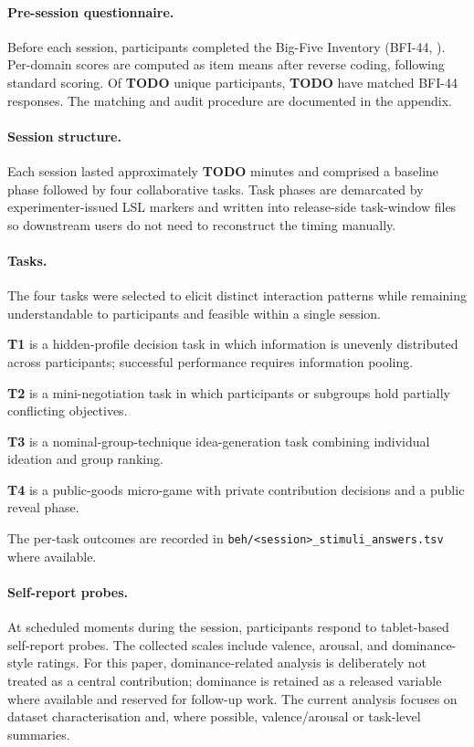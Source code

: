 \documentclass{article}
\begin{document}
\paragraph{Pre-session questionnaire.}
Before each session, participants completed the Big-Five Inventory
(BFI-44, \cite{john1999bigfive}).
Per-domain scores are computed as item means after reverse coding, following
standard scoring.
Of \textbf{TODO} unique participants, \textbf{TODO} have matched BFI-44
responses.
The matching and audit procedure are documented in the appendix.

\paragraph{Session structure.}
Each session lasted approximately \textbf{TODO} minutes and comprised a
baseline phase followed by four collaborative tasks.
Task phases are demarcated by experimenter-issued LSL markers and written
into release-side task-window files so downstream users do not need to
reconstruct the timing manually.

\paragraph{Tasks.}
The four tasks were selected to elicit distinct interaction patterns while
remaining understandable to participants and feasible within a single session.

\textbf{T1} is a hidden-profile decision task in which information is
unevenly distributed across participants; successful performance requires
information pooling.

\textbf{T2} is a mini-negotiation task in which participants or subgroups
hold partially conflicting objectives.

\textbf{T3} is a nominal-group-technique idea-generation task combining
individual ideation and group ranking.

\textbf{T4} is a public-goods micro-game with private contribution decisions
and a public reveal phase.

The per-task outcomes are recorded in
\texttt{beh/<session>\_stimuli\_answers.tsv} where available.

\paragraph{Self-report probes.}
At scheduled moments during the session, participants respond to
tablet-based self-report probes.
The collected scales include valence, arousal, and dominance-style ratings.
For this paper, dominance-related analysis is deliberately not treated as a
central contribution; dominance is retained as a released variable where
available and reserved for follow-up work.
The current analysis focuses on dataset characterisation and, where possible,
valence/arousal or task-level summaries.
\end{document}
